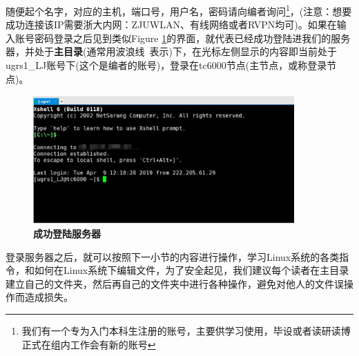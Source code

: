 \documentclass[12pt,a4paper,openany,twoside]{book}
\numberwithin{equation}{section}
\begin{document}
        随便起个名字，对应的主机，端口号，用户名，密码请向编者询问\footnote{我们有一个专为入门本科生注册的账号，主要供学习使用，毕设或者读研读博正式在组内工作会有新的账号}，(注意：想要成功连接该IP需要浙大内网：ZJUWLAN、有线网络或者RVPN均可)。如果在输入账号密码登录之后见到类似Figure \ref{登录服务器}的界面，就代表已经成功登陆进我们的服务器，并处于\textbf{主目录}(通常用波浪线~表示)下，在光标左侧显示的内容即当前处于ugrs1\_LJ账号下(这个是编者的账号)，登录在tc6000节点(主节点，或称登录节点)。
        \begin{figure}
          \centering
          \label{登录服务器}
          \includegraphics[width = 10cm]{fig/xshell3.jpg}
          \caption{\textbf{成功登陆服务器}}
        \end{figure}
        
        登录服务器之后，就可以按照下一小节的内容进行操作，学习Linux系统的各类指令，和如何在Linux系统下编辑文件，为了安全起见，我们建议每个读者在主目录建立自己的文件夹，然后再自己的文件夹中进行各种操作，避免对他人的文件误操作而造成损失。
\end{document}
